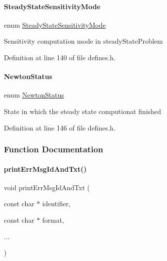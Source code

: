 \paragraph{\texorpdfstring{Steady\+State\+Sensitivity\+Mode}{SteadyStateSensitivityMode}}
{\footnotesize\ttfamily enum \mbox{\hyperlink{namespaceamici_a1f7d44f04185d57423d01d47d13470a6}{Steady\+State\+Sensitivity\+Mode}}\hspace{0.3cm}{\ttfamily [strong]}}

Sensitivity computation mode in steady\+State\+Problem 

Definition at line 140 of file defines.\+h.

\mbox{\label{namespaceamici_a3fb34b6904b8b45827b51132977431da}} 
\paragraph{\texorpdfstring{Newton\+Status}{NewtonStatus}}
{\footnotesize\ttfamily enum \mbox{\hyperlink{namespaceamici_a3fb34b6904b8b45827b51132977431da}{Newton\+Status}}\hspace{0.3cm}{\ttfamily [strong]}}

State in which the steady state computionat finished 

Definition at line 146 of file defines.\+h.



\subsubsection{Function Documentation}
\mbox{\label{namespaceamici_ade28c6a7f1b5aee40bb2453fb61b4024}} 
\paragraph{\texorpdfstring{print\+Err\+Msg\+Id\+And\+Txt()}{printErrMsgIdAndTxt()}}
{\footnotesize\ttfamily void print\+Err\+Msg\+Id\+And\+Txt (\begin{DoxyParamCaption}\item[{const char $\ast$}]{identifier,  }\item[{const char $\ast$}]{format,  }\item[{}]{... }\end{DoxyParamCaption})}

